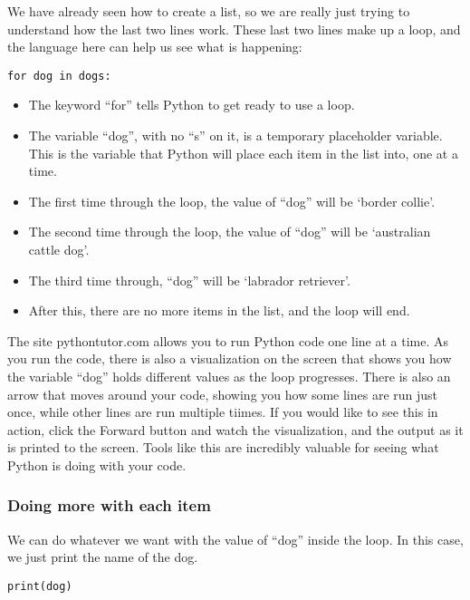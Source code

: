 \documentclass[11pt]{article}
\providecommand{\tightlist}{%
      \setlength{\itemsep}{0pt}\setlength{\parskip}{0pt}}
\begin{document}
    We have already seen how to create a list, so we are really just trying
to understand how the last two lines work. These last two lines make up
a loop, and the language here can help us see what is happening:

\begin{verbatim}
for dog in dogs:
\end{verbatim}

\begin{itemize}
\tightlist
\item
  The keyword ``for'' tells Python to get ready to use a loop.
\item
  The variable ``dog'', with no ``s'' on it, is a temporary placeholder
  variable. This is the variable that Python will place each item in the
  list into, one at a time.
\item
  The first time through the loop, the value of ``dog'' will be `border
  collie'.
\item
  The second time through the loop, the value of ``dog'' will be
  `australian cattle dog'.
\item
  The third time through, ``dog'' will be `labrador retriever'.
\item
  After this, there are no more items in the list, and the loop will
  end.
\end{itemize}

The site pythontutor.com allows you to run Python code one line at a
time. As you run the code, there is also a visualization on the screen
that shows you how the variable ``dog'' holds different values as the
loop progresses. There is also an arrow that moves around your code,
showing you how some lines are run just once, while other lines are run
multiple tiimes. If you would like to see this in action, click the
Forward button and watch the visualization, and the output as it is
printed to the screen. Tools like this are incredibly valuable for
seeing what Python is doing with your code.

\hypertarget{doing-more-with-each-item}{%
\subsubsection{Doing more with each
item}\label{doing-more-with-each-item}}

We can do whatever we want with the value of ``dog'' inside the loop. In
this case, we just print the name of the dog.

\begin{verbatim}
print(dog)
\end{verbatim}
\end{document}
